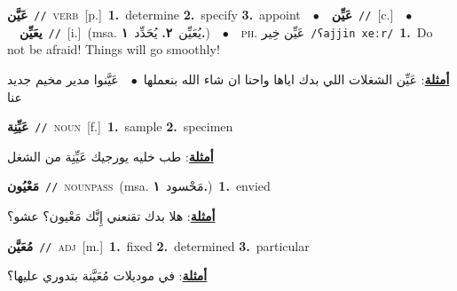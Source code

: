 \documentclass[10pt,a4paper,twoside]{article} %
\begin{document}
\begin{multicols}{2}
{\setlength\topsep{0pt}\textbf{\foreignlanguage{arabic}{عَيَّن}}\ {\color{gray}\texttt{//}\color{black}}\ \textsc{verb}\ [p.]\ \textbf{1.}~determine  \textbf{2.}~specify  \textbf{3.}~appoint\ \ $\bullet$\ \ \setlength\topsep{0pt}\textbf{\foreignlanguage{arabic}{عَيِّن}}\ {\color{gray}\texttt{//}\color{black}}\ [c.]\ \ $\bullet$\ \ \setlength\topsep{0pt}\textbf{\foreignlanguage{arabic}{يعَيِّن}}\ {\color{gray}\texttt{//}\color{black}}\ [i.]\ \color{gray}(msa. \foreignlanguage{arabic}{يُعَيِّن}~\foreignlanguage{arabic}{\textbf{٢.}}  \foreignlanguage{arabic}{يُحَدِّد}~\foreignlanguage{arabic}{\textbf{١.}})\color{black}\ \ $\bullet$\ \ \textsc{ph.} \color{gray} \foreignlanguage{arabic}{عَيِّن خِير}\color{black}\ {\color{gray}\texttt{/{\sffamily ʕajjin xeːr}/}\color{black}}\ \textbf{1.}~Do not be afraid! Things will go smoothly!\  \begin{flushright}\color{gray}\foreignlanguage{arabic}{\textbf{\underline{\foreignlanguage{arabic}{أمثلة}}}: عَيِّن الشغلات اللي بدك اياها واحنا ان شاء الله بنعملها\ $\bullet$\ \  عَيَّنوا مدير مخيم جديد عنا}\end{flushright}\color{black}} \vspace{2mm}

{\setlength\topsep{0pt}\textbf{\foreignlanguage{arabic}{عَيِّنِة}}\ {\color{gray}\texttt{//}\color{black}}\ \textsc{noun}\ [f.]\ \textbf{1.}~sample  \textbf{2.}~specimen\  \begin{flushright}\color{gray}\foreignlanguage{arabic}{\textbf{\underline{\foreignlanguage{arabic}{أمثلة}}}: طب خليه يورجيك عَيِّنِة من الشغل}\end{flushright}\color{black}} \vspace{2mm}

{\setlength\topsep{0pt}\textbf{\foreignlanguage{arabic}{مَعْيُون}}\ {\color{gray}\texttt{//}\color{black}}\ \textsc{noun\textunderscore pass}\ \color{gray}(msa. \foreignlanguage{arabic}{مَحْسود}~\foreignlanguage{arabic}{\textbf{١.}})\color{black}\ \textbf{1.}~envied\  \begin{flushright}\color{gray}\foreignlanguage{arabic}{\textbf{\underline{\foreignlanguage{arabic}{أمثلة}}}: هلا بدك تقنعني إِنَّك مَعْيون؟ عشو؟}\end{flushright}\color{black}} \vspace{2mm}

{\setlength\topsep{0pt}\textbf{\foreignlanguage{arabic}{مُعَيَّن}}\ {\color{gray}\texttt{//}\color{black}}\ \textsc{adj}\ [m.]\ \textbf{1.}~fixed  \textbf{2.}~determined  \textbf{3.}~particular\  \begin{flushright}\color{gray}\foreignlanguage{arabic}{\textbf{\underline{\foreignlanguage{arabic}{أمثلة}}}: في موديلات مُعَيَّنة بتدوري عليها؟}\end{flushright}\color{black}} \vspace{2mm}


\end{multicols}
\end{document}

